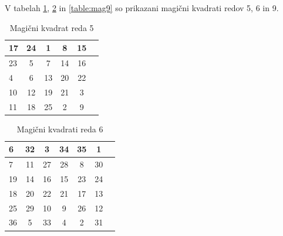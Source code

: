 \documentclass[a4paper,12pt]{article}
\begin{document}
V tabelah \ref{table:mg5}, \ref{table:mag6} in \ref{table:mag9} so prikazani
magični kvadrati redov 5, 6 in 9.


\begin{table}[htp]
   \centering
   \normalsize
   \caption{Magični kvadrat reda 5}
   \label{table:mg5}
   \begin{tabular}{|l|c|c|c|c|c|}
      \hline

         17 & 24 &  1 &  8 & 15 \\\hline
         23 &  5 &  7 & 14 & 16 \\\hline
         4 &   6 & 13 & 20 & 22 \\\hline
         10 & 12 & 19 & 21 &  3 \\\hline
         11 & 18 & 25 &  2 &  9 \\\hline
      
   \end{tabular}
\end{table}



\begin{table}[htp]
   \centering
   \normalsize
   \caption{Magični kvadrati reda 6}
   \label{table:mag6}
   \begin{tabular}{|l|c|c|c|c|c|c|}
      \hline
       6 & 32 &  3 & 34 & 35 &  1 \\\hline
       7 & 11 & 27 & 28 &  8 & 30 \\\hline
      19 & 14 & 16 & 15 & 23 & 24 \\\hline
      18 & 20 & 22 & 21 & 17 & 13 \\\hline
      25 & 29 & 10 &  9 & 26 & 12 \\\hline
      36 &  5 & 33 &  4 &  2 & 31 \\\hline
   \end{tabular}
\end{table}

\end{document}
